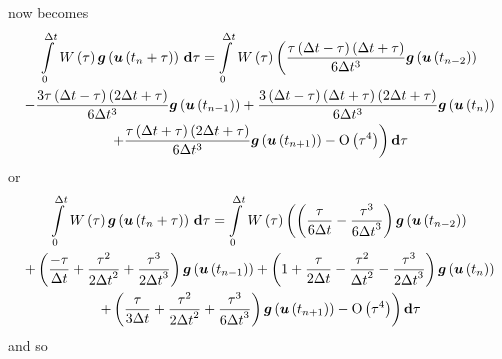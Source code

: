 now becomes
\begin{multline}
    \displaystyle\int\limits_{0}^{\Delta
    t} \, W\left( \tau \right)  \boldsymbol{g}\left(  \boldsymbol{u}\left( t_{n}+\tau \right)  \right) \, \boldsymbol{\mathrm{d}} \tau  =
   \displaystyle\int\limits_{0}^{\Delta t} \, W\left( \tau \right) \left(\dfrac{\tau\left( \Delta
      t-\tau \right)\left( \Delta t+\tau \right)}{6\Delta
    t^{3}} \boldsymbol{g}\left(  \boldsymbol{u}\left( t_{n-2} \right)  \right) \right. \\ \left.-\dfrac{3\tau\left( \Delta
      t-\tau \right)\left( 2\Delta t+\tau \right)}{6\Delta
    t^{3}} \boldsymbol{g}\left(  \boldsymbol{u}\left( t_{n-1} \right)  \right)  +\dfrac{3\left( \Delta
      t-\tau \right)\left( \Delta t+\tau \right)\left( 2\Delta t+\tau \right)}{6\Delta
    t^{3}} \boldsymbol{g}\left(  \boldsymbol{u}\left( t_{n} \right)  \right) \right.\\ \left.+\dfrac{\tau\left( \Delta
      t+\tau \right)\left( 2\Delta t+\tau \right)}{6\Delta
    t^{3}} \boldsymbol{g}\left(  \boldsymbol{u}\left( t_{n+1} \right)  \right) - \mathrm{O}\left( \tau^{4} \right) \right) \boldsymbol{\mathrm{d}} \tau
\end{multline}
or
\begin{multline}
    \displaystyle\int\limits_{0}^{\Delta
    t} \, W\left( \tau \right)  \boldsymbol{g}\left(  \boldsymbol{u}\left( t_{n}+\tau \right)  \right) \, \boldsymbol{\mathrm{d}} \tau  =
   \displaystyle\int\limits_{0}^{\Delta t} \, W\left( \tau \right) 
  \left(\left( \dfrac{\tau}{6{\Delta t}}-\dfrac{\tau^{3}}{6{\Delta t}^{3}} \right)
   \boldsymbol{g}\left(  \boldsymbol{u}\left( t_{n-2} \right)  \right) \right. \\
  \left.+\left( \dfrac{-\tau}{{\Delta t}}+\dfrac{\tau^{2}}{2{\Delta t}^{2}}+\dfrac{\tau^{3}}{2{\Delta t}^{3}} \right)
   \boldsymbol{g}\left(  \boldsymbol{u}\left( t_{n-1} \right)  \right) 
  +\left( 1+\dfrac{\tau}{2{\Delta t}}-\dfrac{\tau^{2}}{{\Delta t}^{2}}-\dfrac{\tau^{3}}{2{\Delta t}^{3}} \right)
   \boldsymbol{g}\left(  \boldsymbol{u}\left( t_{n} \right)  \right) \right.\\
  \left.+\left( \dfrac{\tau}{3{\Delta t}}+\dfrac{\tau^{2}}{2{\Delta t}^{2}}+\dfrac{\tau^{3}}{6{\Delta t}^{3}} \right)
   \boldsymbol{g}\left(  \boldsymbol{u}\left( t_{n+1} \right)  \right) 
  - \mathrm{O}\left( \tau^{4} \right) \right) \boldsymbol{\mathrm{d}} \tau
\end{multline}
and so
